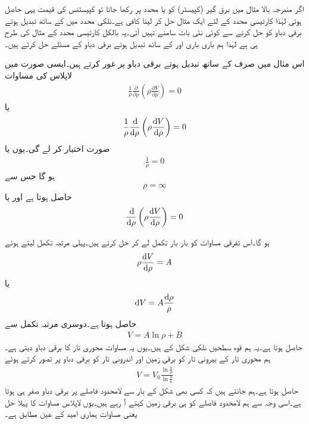 اگر مندرجہ بالا مثال میں برق گیر (کپیسٹر)  کو  یا  محدد پر رکھا جاتا تو کپیسٹنس کی قیمت یہی حاصل ہوتی لہٰذا کارتیسی محدد کے لئے ایک مثال حل کر لینا کافی ہے۔نلکی محدد میں  کے ساتھ تبدیل ہوتے برقی دباو کو حل کرنے سے کوئی نئی بات سامنے نہیں آتی۔یہ بالکل کارتیسی محدد کے مثال کی طرح ہی ہے لہٰذا ہم باری باری  اور  کے ساتھ تبدیل ہوتے برقی دباو کے مسئلے حل کرتے ہیں۔


اس مثال میں صرف  کے ساتھ تبدیل ہوتے برقی دباو پر غور کرتے ہیں۔ایسی صورت میں لاپلاس کی مساوات
\begin{align*}
\frac{1}{\rho} \frac{\partial}{\partial \rho} \left(\rho \frac{\partial V}{\partial \rho} \right)=0
\end{align*}
یا
\begin{align}\label{مساوات_لاپلاس_ہم_محوری_لاپلاسی}
\frac{1}{\rho}\frac{\dif}{\dif \rho} \left(\rho \frac{\dif V}{\dif \rho} \right)=0
\end{align}
صورت اختیار کر لے گی۔یوں یا
\begin{align*}
\frac{1}{\rho}=0
\end{align*}
ہو گا جس سے
\begin{align}\label{مساوات_لاپلاس_ہم_محوری_لاپلاسی_پہلا-حل}
\rho=\infty
\end{align}
حاصل ہوتا ہے اور یا
\begin{align}\label{مساوات_لاپلاس_ہم_محوری_لاپلاسی_ب}
\frac{\dif}{\dif \rho} \left(\rho \frac{\dif V}{\dif \rho} \right)=0
\end{align}

ہو گا۔اس تفرقی مساوات کو بار بار تکمل لے کر حل کرتے ہیں۔پہلی مرتبہ تکمل لیتے ہوئے
\begin{align*}
\rho \frac{\dif V}{\dif \rho}=A
\end{align*}
یا
\begin{align*}
\dif V=A \frac{\dif \rho}{\rho}
\end{align*}
حاصل ہوتا ہے۔دوسری مرتبہ تکمل سے
\begin{align*}
V=A \ln \rho+B
\end{align*}
حاصل ہوتا ہے۔یہ ہم قوہ سطحیں نلکی شکل کے ہیں۔یوں یہ مساوات محوری تار کا برقی دباو دیتی ہے۔ہم محوری تار کے بیرونی تار  کو برقی زمین اور اندرونی تار  کو  برقی دباو پر تصور کرتے ہوئے
\begin{align}\label{مساوات_لاپلاس_ہم_محوری_لاپلاسی_ب_حل}
V=V_0 \frac{\ln \frac{b}{\rho} }{\ln \frac{b}{a} }
\end{align}
حاصل ہوتا ہے۔ہم جانتے ہیں کہ کسی بھی شکل کے بار سے لامحدود فاصلے پر برقی دباو صفر ہی ہوتا ہے۔اسی وجہ سے ہم لامحدود فاصلے کو ہی برقی زمین کہتے آ رہے ہیں۔یوں لاپلاس مساوات کا پہلا حل یعنی مساوات  ہماری امید کے عین مطابق ہے۔

